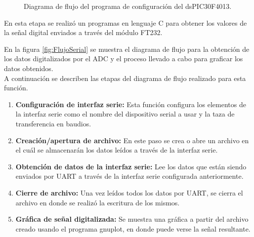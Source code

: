 	\begin{figure}[htbp!]
		\centering
		\caption{Diagrama de flujo del programa de configuración del dsPIC30F4013.}
		\label{fig:ConfiguracionMicro}
	\end{figure}

En esta etapa se realizó un programas en lenguaje C para obtener los valores de la señal digital enviados a través del módulo FT232.

En la figura \ref{fig:FlujoSerial} se muestra el diagrama de flujo para la obtención de los datos digitalizados por el ADC y el proceso llevado a cabo para graficar los datos obtenidos.\\

A continuación se describen las etapas del diagrama de flujo realizado para esta función.
\begin{enumerate}
	\item \textbf{Configuración de interfaz serie:} Esta función configura los elementos de la interfaz serie como el nombre del dispositivo serial a usar y la taza de transferencia en baudios.
	\item \textbf{Creación/apertura de archivo:} En este paso se crea o abre un archivo en el cuál se almacenarán los datos leídos a través de la interfaz serie.
	\item \textbf{Obtención de datos de la interfaz serie:} Lee los datos que están siendo enviados por UART a través de la interfaz serie configurada anteriormente.
	\item \textbf{Cierre de archivo:} Una vez leídos todos los datos por UART, se cierra el archivo en donde se realizó la escritura de los mismos.
	\item \textbf{Gráfica de señal digitalizada:} Se muestra una gráfica a partir del archivo creado usando el programa gnuplot, en donde puede verse la señal resultante.
\end{enumerate}

